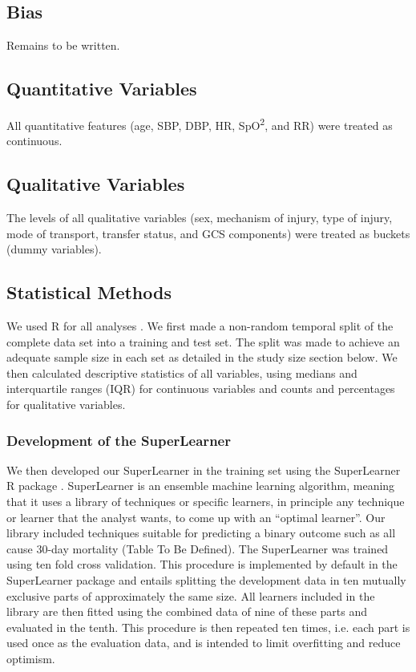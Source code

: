 \documentclass[10pt,letterpaper]{article}\usepackage[]{graphicx}\usepackage[]{color}
\begin{document}
\subsection*{Bias}
Remains to be written.

\subsection*{Quantitative Variables}
All quantitative features (age, SBP, DBP, HR, SpO\textsuperscript{2}, and RR) were
treated as continuous.

\subsection*{Qualitative Variables}
The levels of all qualitative variables (sex, mechanism of injury, type of
injury, mode of transport, transfer status, and GCS components) were treated as
buckets (dummy variables).

\subsection*{Statistical Methods}
We used R for all analyses \cite{R}. We first made a non-random temporal split
of the complete data set into a training and test set. The split was made to
achieve an adequate sample size in each set as detailed in the study size
section below. We then calculated descriptive statistics of all variables, using
medians and interquartile ranges (IQR) for continuous variables and counts and
percentages for qualitative variables.

\subsubsection*{Development of the SuperLearner}
We then developed our SuperLearner in the training set using the SuperLearner R
package \cite{SuperLearner}. SuperLearner is an ensemble machine learning
algorithm, meaning that it uses a library of techniques or specific learners, in
principle any technique or learner that the analyst wants, to come up with an
``optimal learner''. Our library included techniques suitable for predicting a
binary outcome such as all cause 30-day mortality (Table To Be Defined). The
SuperLearner was trained using ten fold cross validation. This procedure is
implemented by default in the SuperLearner package and entails splitting the
development data in ten mutually exclusive parts of approximately the same
size. All learners included in the library are then fitted using the combined
data of nine of these parts and evaluated in the tenth. This procedure is then
repeated ten times, i.e. each part is used once as the evaluation data, and is
intended to limit overfitting and reduce optimism.
\end{document}
